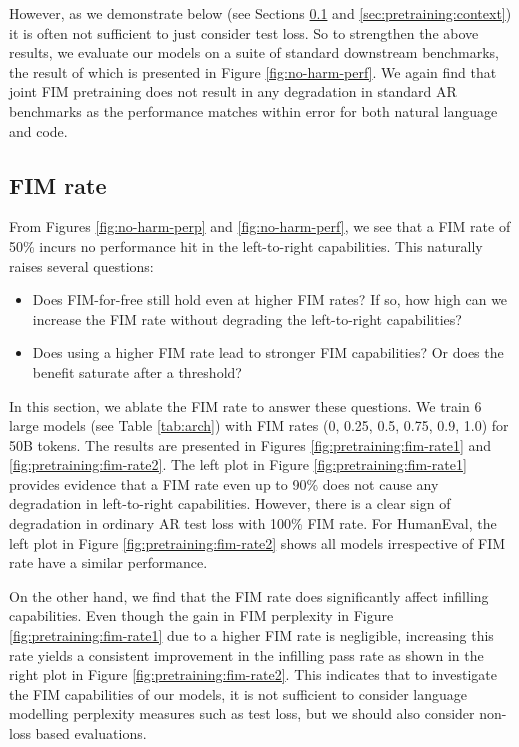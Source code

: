 \documentclass[postscript]{article}
\begin{document}
However, as we demonstrate below (see Sections \ref{sec:pretraining:fim-rate} and \ref{sec:pretraining:context}) it is often not sufficient to just consider test loss. So to strengthen the above results, we evaluate our models on a suite of standard downstream benchmarks, the result of which is presented in Figure \ref{fig:no-harm-perf}. We again find that joint FIM pretraining does not result in any degradation in standard AR benchmarks as the performance matches within error for both natural language and code.

\subsection{FIM rate}
\label{sec:pretraining:fim-rate}

From Figures \ref{fig:no-harm-perp} and \ref{fig:no-harm-perf}, we see that a FIM rate of 50\% incurs no performance hit in the left-to-right capabilities. This naturally raises several questions:
\begin{itemize}
    \item Does FIM-for-free still hold even at higher FIM rates? If so, how high can we increase the FIM rate without degrading the left-to-right capabilities?
    \item Does using a higher FIM rate lead to stronger FIM capabilities? Or does the benefit saturate after a threshold?
\end{itemize}
In this section, we ablate the FIM rate to answer these questions. We train 6 large models (see Table \ref{tab:arch}) 
with FIM rates (0, 0.25, 0.5, 0.75, 0.9, 1.0) for 50B tokens. The results are presented in Figures \ref{fig:pretraining:fim-rate1} and \ref{fig:pretraining:fim-rate2}. The left plot in Figure \ref{fig:pretraining:fim-rate1} provides evidence that a FIM rate even up to 90\% does not cause any degradation in left-to-right capabilities.
However, there is a clear sign of degradation in ordinary AR test loss with 100\% FIM rate. For HumanEval, the left plot in Figure \ref{fig:pretraining:fim-rate2} shows all models irrespective of FIM rate have a similar performance.


On the other hand, we find that the FIM rate does significantly affect infilling capabilities. Even though the gain in FIM perplexity in Figure \ref{fig:pretraining:fim-rate1} due to a higher FIM rate is negligible, increasing this rate yields a consistent improvement in the infilling pass rate as shown in the right plot in Figure \ref{fig:pretraining:fim-rate2}. This indicates that to investigate the FIM capabilities of our models, it is not sufficient to consider language modelling perplexity measures such as test loss, but we should also consider non-loss based evaluations.
\end{document}
